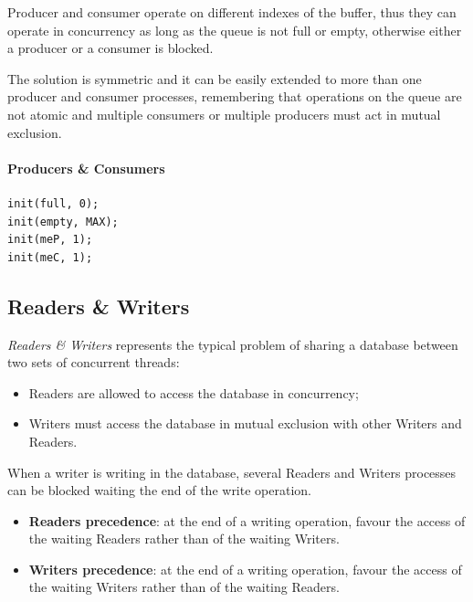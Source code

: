 Producer and consumer operate on different indexes of the buffer, thus they can operate in concurrency as long as the queue is not full or empty, otherwise either a producer or a consumer is blocked.

The solution is symmetric and it can be easily extended to more than one producer and consumer processes, remembering that operations on the queue are not atomic and multiple consumers or multiple producers must act in mutual exclusion.

\paragraph{Producers \& Consumers}
\begin{verbatim}
init(full, 0);
init(empty, MAX);
init(meP, 1);
init(meC, 1);
\end{verbatim}

\begin{Parallel}{}{}
\end{Parallel}

\newpage

\subsection{Readers \& Writers}
\emph{Readers \& Writers} represents the typical problem of sharing a database between two sets of concurrent threads:
\begin{itemize}
\item Readers are allowed to access the database in concurrency;
\item Writers must access the database in mutual exclusion with other Writers and Readers.
\end{itemize}
When a writer is writing in the database, several Readers and Writers processes can be blocked waiting the end of the write operation.

\begin{itemize}
\item \textbf{Readers precedence}: at the end of a writing operation, favour the access of the waiting Readers rather than of the waiting Writers.
\item \textbf{Writers precedence}: at the end of a writing operation, favour the access of the waiting Writers rather than of the waiting Readers.
\end{itemize}

